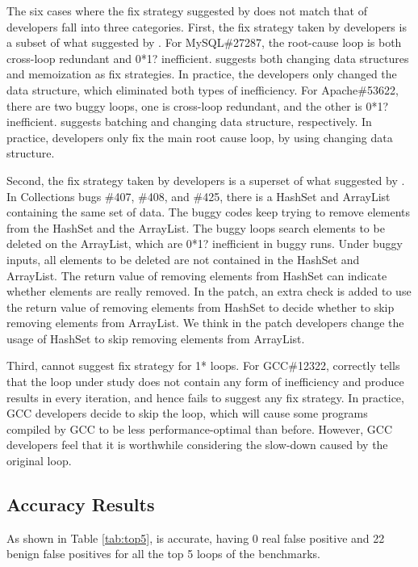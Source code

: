 The six cases where the fix strategy suggested by \Tool does not match that of 
developers fall into three categories.
First, the fix strategy taken by developers is a subset of what suggested by 
\Tool.
{\color{red} For MySQL\#27287, the root-cause loop
is both cross-loop redundant and 0*1? inefficient. \Tool suggests both changing
data structures and memoization as fix strategies. In practice, the developers
only changed the data structure, which eliminated both types of inefficiency. 
For Apache\#53622, there are two buggy loops, one is cross-loop redundant, and the other is 0*1? inefficient. 
\Tool suggests batching and changing data structure, respectively. 
In practice, developers only fix the main root cause loop, by using changing data structure.} 

Second, the fix strategy taken by developers is a superset of what suggested by
\Tool.
{\color{red} In Collections bugs \#407, \#408, and \#425, there is a HashSet and ArrayList containing the same set of data. 
The buggy codes keep trying to remove elements from the HashSet and the ArrayList. 
The buggy loops search elements to be deleted on the ArrayList, which are 0*1? inefficient in buggy runs. 
Under buggy inputs, all elements to be deleted are not contained in the HashSet and ArrayList. 
The return value of removing elements from HashSet can indicate whether elements are really removed. 
In the patch, an extra check is added to use the return value of removing elements from HashSet 
to decide whether to skip removing elements from ArrayList. 
We think in the patch developers change the usage of HashSet to skip removing elements from ArrayList. }

Third, \Tool cannot suggest fix strategy for 1* loops.
For GCC\#12322, \Tool correctly tells that the loop under study
does not contain any form of inefficiency and produce results in every 
iteration, and hence fails to suggest any fix strategy. In practice, GCC
developers decide to skip the loop, which will cause some programs compiled by
GCC
to be less performance-optimal than before. However, GCC developers feel
that it is worthwhile considering the slow-down caused by the original loop.

\subsection{Accuracy Results}
\label{sec:result_acc}



As shown in Table \ref{tab:top5}, \Tool is accurate, having 0 real
false positive and 22 benign false positives for all the top 5 loops
of the \allbugs benchmarks.

